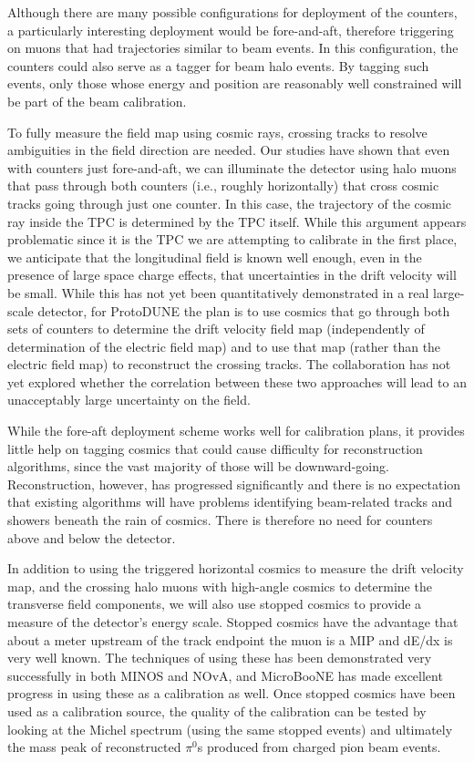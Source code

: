         Although there are many possible configurations for deployment of the
counters, a particularly interesting deployment would be fore-and-aft,
therefore triggering on muons that had trajectories similar to beam events. In
this configuration, the counters could also serve as a tagger for beam halo
events.  By tagging such events, only those whose energy and position are
reasonably well constrained will be part of the beam calibration.

        To fully measure the field map using cosmic rays, crossing
tracks to resolve ambiguities in the field direction are needed.  Our studies have shown
that even with counters just fore-and-aft, we can illuminate the detector
using halo muons that pass through both counters (i.e., roughly horizontally)
that cross cosmic tracks going through just one counter. In this case, the
trajectory of the cosmic ray inside the TPC is determined by the TPC itself.
While this argument appears problematic since it is the TPC we are attempting
to calibrate in the first place, we anticipate that the longitudinal field is
known well enough, even in the presence of large space charge effects, that
uncertainties in the drift velocity will be small.  While this has not yet been
quantitatively demonstrated in a real large-scale detector, for ProtoDUNE the plan 
is to use cosmics that go through both sets of counters to determine the drift
velocity field map (independently of determination of the electric field map)
and to use that map (rather than the electric field map) to reconstruct the
crossing tracks.  The collaboration has not yet explored whether the correlation between
these two approaches will lead to an unacceptably large uncertainty on the
field.

 While the fore-aft deployment scheme works well for calibration plans,
it provides little help on tagging cosmics that could cause difficulty for
reconstruction algorithms, since the vast majority of those will be
downward-going.  Reconstruction, however, has progressed significantly and
there is no expectation that existing algorithms will have problems identifying
beam-related tracks and showers beneath the rain of cosmics. There is therefore
no need for counters above and below the detector.

        In addition to using the triggered horizontal cosmics to measure the
drift velocity map, and the crossing halo muons with high-angle cosmics to
determine the transverse field components, we will also use stopped cosmics to
provide a measure of the detector's energy scale. Stopped cosmics have the
advantage that about a meter upstream of the track endpoint the muon is a MIP
and dE/dx is very well known. The techniques of using these has been
demonstrated very successfully in both MINOS and NOvA, and MicroBooNE has made
excellent progress in using these as a calibration as well. Once stopped cosmics have been 
used as a calibration source, the quality of the calibration can be tested by looking at the Michel
spectrum (using the same stopped events) and ultimately the mass peak of
reconstructed $\pi^0$s produced from charged pion beam events.

